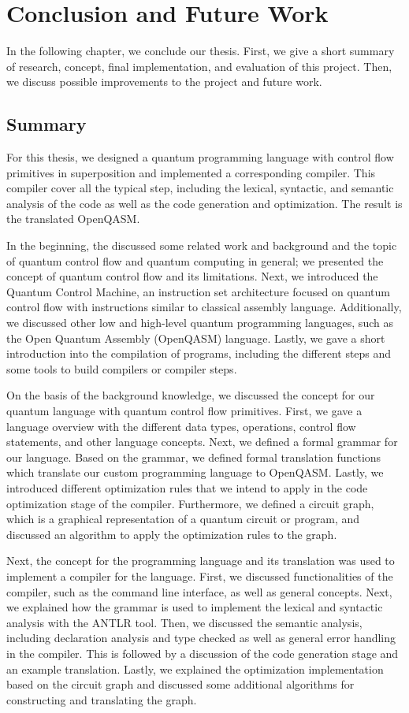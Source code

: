 \chapter{Conclusion and Future Work}
In the following chapter, we conclude our thesis. First, we give a short summary of research, concept, final implementation, and evaluation of this project. Then, we discuss possible improvements to the project and future work. 

\section{Summary}
For this thesis, we designed a quantum programming language with control flow primitives in superposition and implemented a corresponding compiler. This compiler cover all the typical step, including the lexical, syntactic, and semantic analysis of the code as well as the code generation and optimization. The result is the translated OpenQASM.

In the beginning, the discussed some related work and background and the topic of quantum control flow and quantum computing in general; we presented the concept of quantum control flow and its limitations. Next, we introduced the Quantum Control Machine, an instruction set architecture focused on quantum control flow with instructions similar to classical assembly language. Additionally, we discussed other low and high-level quantum programming languages, such as the Open Quantum Assembly (OpenQASM) language. Lastly, we gave a short introduction into the compilation of programs, including the different steps and some tools to build compilers or compiler steps.

On the basis of the background knowledge, we discussed the concept for our quantum language with quantum control flow primitives. First, we gave a language overview with the different data types, operations, control flow statements, and other language concepts. Next, we defined a formal grammar for our language. Based on the grammar, we defined formal translation functions which translate our custom programming language to OpenQASM. Lastly, we introduced different optimization rules that we intend to apply in the code optimization stage of the compiler. Furthermore, we defined a circuit graph, which is a graphical representation of a quantum circuit or program, and discussed an algorithm to apply the optimization rules to the graph.

Next, the concept for the programming language and its translation was used to implement a compiler for the language. First, we discussed functionalities of the compiler, such as the command line interface, as well as general concepts. Next, we explained how the grammar is used to implement the lexical and syntactic analysis with the ANTLR tool. Then, we discussed the semantic analysis, including declaration analysis and type checked as well as general error handling in the compiler. This is followed by a discussion of the code generation stage and an example translation. Lastly, we explained the optimization implementation based on the circuit graph and discussed some additional algorithms for constructing and translating the graph. 

